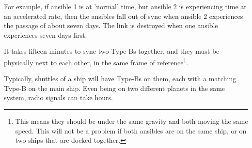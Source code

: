 \par
For example, if ansible 1 is at 'normal' time, but ansible 2 is experiencing time at an accelerated rate, then the ansibles fall out of sync when ansible 2 experiences the passage of about seven days. The link is destroyed when one ansible experiences seven days first.

\par
It takes fifteen minutes to sync two Type-Bs together, and they must be physically next to each other, in the same frame of reference\footnote{This means they should be under the same gravity and both moving the same speed. This will not be a problem if both ansibles are on the same ship, or on two ships that are docked together.}.

\par
Typically, shuttles of a ship will have Type-Bs on them, each with a matching Type-B on the main ship. Even being on two different planets in the same system, radio signals can take hours.